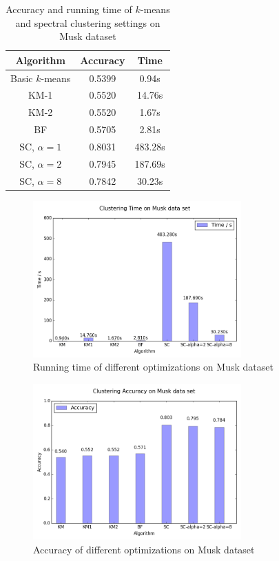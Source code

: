 \documentclass{acm_proc_article-sp}
\begin{document}
\begin{table}
\centering
\begin{tabular}{|c|cc|}
\hline
Algorithm & Accuracy & Time \\
\hline
 Basic $k$-means & 0.5399 & 0.94s\\
 KM-1 & 0.5520 & 14.76s\\
 KM-2 & 0.5520 & 1.67s\\
 BF & 0.5705 & 2.81s\\
 SC, $\alpha=1$ & 0.8031 & 483.28s\\
 SC, $\alpha=2$ & 0.7945 & 187.69s\\
 SC, $\alpha=8$ & 0.7842 & 30.23s\\
 \hline
\end{tabular}
\caption{Accuracy and running time of $k$-means and spectral clustering settings on Musk dataset}
\label{table_musk}
\end{table}

\begin{figure}
\centering
\includegraphics[height=6cm]{mt.png}
\caption{Running time of different optimizations on Musk dataset}
\label{figure_musk_time}
\end{figure}

\begin{figure}
\centering
\includegraphics[height=6cm]{ma.png}
\caption{Accuracy of different optimizations on Musk dataset}
\label{figure_musk_accu}
\end{figure}
\end{document}
